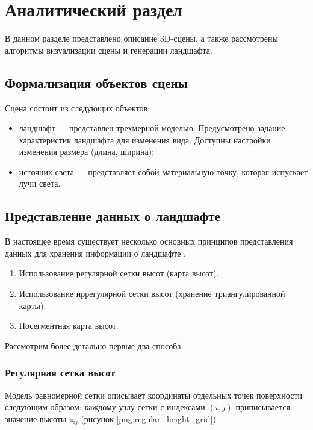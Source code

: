\chapter{Аналитический раздел}
В данном разделе представлено описание 3D-сцены, а также рассмотрены алгоритмы визуализации сцены и генерации ландшафта.

\section{Формализация объектов сцены}
Сцена состоит из следующих объектов:
\begin{itemize}
	\item ландшафт — представлен трехмерной моделью. Предусмотрено задание характеристик ландшафта для изменения вида. Доступны настройки изменения размера (длина, ширина);
	\item источник света — представляет собой материальную точку, которая испускает лучи света.
\end{itemize}

\section{Представление данных о ландшафте}
В настоящее время существует несколько основных принципов представления данных для хранения информации о ландшафте \cite{data_landscape}.
\begin{enumerate}
	\item Использование регулярной сетки высот (карта высот).
	\item Использование иррегулярной сетки высот (хранение триангулированной карты).
	\item Посегментная карта высот.
\end{enumerate}

Рассмотрим более детально первые два способа.
\subsection{Регулярная сетка высот}
Модель равномерной сетки описывает координаты отдельных точек поверхности следующим образом: каждому узлу сетки с индексами $(i,j)$ приписывается значение высоты $z_{ij}$ (рисунок \ref{png:regular_height_grid}).

\begin{figure}[H]
\end{figure}

